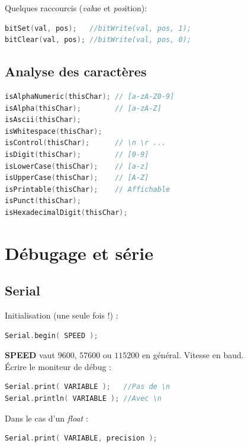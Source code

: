             \bmar
                Quelques raccourcis (\textit{val}ue et \textit{pos}ition):
            \emar

            \begin{lstlisting}[language=C]
bitSet(val, pos);   //bitWrite(val, pos, 1);
bitClear(val, pos); //bitWrite(val, pos, 0);
            \end{lstlisting}


        \subsection{Analyse des caractères}
            \begin{lstlisting}[language=C]
isAlphaNumeric(thisChar); // [a-zA-Z0-9]
isAlpha(thisChar);        // [a-zA-Z]
isAscii(thisChar);
isWhitespace(thisChar);
isControl(thisChar);      // \n \r ...
isDigit(thisChar);        // [0-9]
isLowerCase(thisChar);    // [a-z]
isUpperCase(thisChar);    // [A-Z]
isPrintable(thisChar);    // Affichable
isPunct(thisChar);
isHexadecimalDigit(thisChar);
            \end{lstlisting}

    \section{Débugage et série}
        \subsection{Serial}
            \bmar
                Initialisation (une seule fois !) :
            \emar

            \begin{lstlisting}[language=C]
Serial.begin( SPEED );
            \end{lstlisting}
            \bmar
                \textbf{SPEED} vaut $9600$, $57600$ ou $115200$ en général. Vitesse en baud.\\
                Écrire le moniteur de débug :
            \emar

            \begin{lstlisting}[language=C]
Serial.print( VARIABLE );   //Pas de \n
Serial.println( VARIABLE ); //Avec \n
            \end{lstlisting}

            \bmar
                Dans le cas d'un \textit{float} :
            \emar

            \begin{lstlisting}[language=C]
Serial.print( VARIABLE, precision );
            \end{lstlisting}

